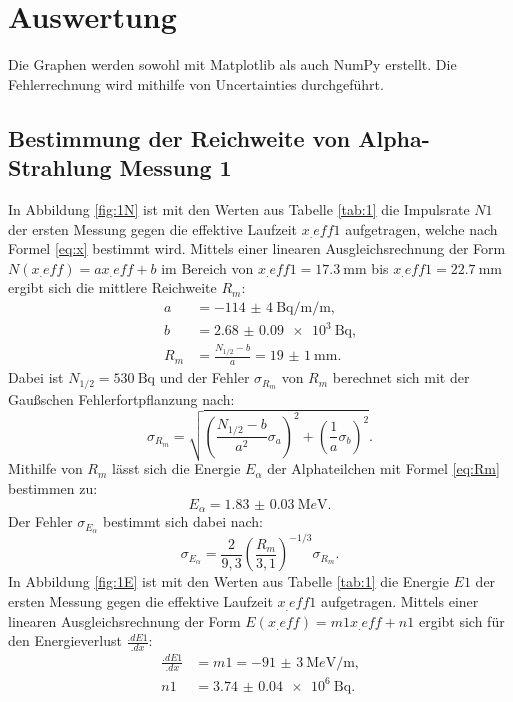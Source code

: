 \section{Auswertung}
\label{sec:Auswertung}

Die Graphen werden sowohl mit Matplotlib \cite{matplotlib} als auch NumPy \cite{numpy} erstellt. Die Fehlerrechnung wird mithilfe von Uncertainties \cite{uncertainties} durchgeführt.

\subsection{Bestimmung der Reichweite von Alpha-Strahlung Messung 1}

In Abbildung \ref{fig:1N} ist mit den Werten aus Tabelle \ref{tab:1} die Impulsrate $N1$ der ersten Messung gegen die effektive Laufzeit $x_.{eff1}$ aufgetragen, welche nach Formel \eqref{eq:x} bestimmt wird.
Mittels einer linearen Ausgleichsrechnung der Form $N(x_.{eff})=a x_.{eff} +b$ im Bereich von $x_.{eff1} = \SI{17.3}{\milli\metre}$ bis $x_.{eff1} = \SI{22.7}{\milli\metre}$ ergibt sich die mittlere Reichweite $R_m$:
\begin{align*}
a	&= \SI{-114(4)}{\becquerel\per\milli\per\metre}\text{,}\\
b	&= \SI{2.68(9)e3}{\becquerel}\text{,}\\
R_m	&= \frac{N_{1/2}-b}{a} = \SI{19(1)}{\milli\metre}\text{.}
\end{align*}
Dabei ist $N_{1/2} = \SI{530}{\becquerel}$ und der Fehler $\sigma_{R_m}$ von $R_m$ berechnet sich mit der Gaußschen Fehlerfortpflanzung nach:
\begin{equation*}
\sigma_{R_m} = \sqrt{\left(\frac{N_{1/2}-b}{a^2}\sigma_a\right)^2+\left(\frac{1}{a}\sigma_b\right)^2}\text{.}
\end{equation*} 
Mithilfe von $R_m$ lässt sich die Energie $E_\alpha$ der Alphateilchen mit Formel \eqref{eq:Rm} bestimmen zu:
\begin{equation*}
E_\alpha = \SI{1.83(3)}{\mega e\volt}\text{.}
\end{equation*} 
Der Fehler $\sigma_{E_\alpha}$ bestimmt sich dabei nach:
\begin{equation*}
\sigma_{E_\alpha} = \frac{2}{9,3}\left(\frac{R_m}{3,1}\right)^{-1/3}\sigma_{R_m}\text{.}
\end{equation*} 
In Abbildung \ref{fig:1E} ist mit den Werten aus Tabelle \ref{tab:1} die Energie $E1$ der ersten Messung gegen die effektive Laufzeit $x_.{eff1}$ aufgetragen.
Mittels einer linearen Ausgleichsrechnung der Form $E(x_.{eff})=m1 x_.{eff} +n1$ ergibt sich für den Energieverlust $\frac{.dE1}{.dx}$:
\begin{align*}
\frac{.dE1}{.dx}	&= m1 = \SI{-91(3)}{\mega e\volt\per\metre}\text{,}\\
n1	&= \SI{3.74(4)e6}{\becquerel}\text{.}
\end{align*}

